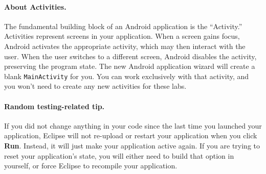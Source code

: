 \documentclass[10pt]{article}
\begin{document}
\paragraph{About Activities.}
The fundamental building block of an Android application is the ``Activity.'' Activities represent screens in your application. When a screen gains focus, Android activates the appropriate activity, which may then interact with the user. When the user switches to a different screen, Android disables the activity, preserving the program state.
The new Android application wizard will create a blank \texttt{MainActivity} for you. You can work exclusively with that activity, and you won't need to create any new activities for these labs.
\paragraph{Random testing-related tip.} If you did not change anything in your code since the last time you launched your application, Eclipse will not re-upload or restart your application when you click \textbf{Run}. Instead, it will just make your application active again. If you are trying to reset your application's state, you will either need to build that option in yourself, or force Eclipse to recompile your application.
\end{document}
